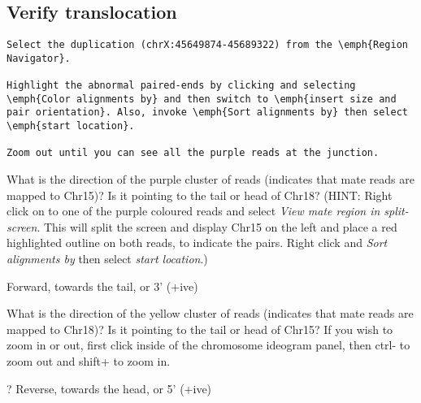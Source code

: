 \subsection{Verify translocation}
\begin{advanced}

\begin{lstlisting}
Select the duplication (chrX:45649874-45689322) from the \emph{Region Navigator}. 

Highlight the abnormal paired-ends by clicking and selecting \emph{Color alignments by} and then switch to \emph{insert size and pair orientation}. Also, invoke \emph{Sort alignments by} then select \emph{start location}.

Zoom out until you can see all the purple reads at the junction.
\end{lstlisting}
\end{advanced}


\begin{questions}
What is the direction of the purple cluster of reads (indicates that mate reads are mapped to Chr15)? Is it pointing to the tail or head of Chr18? 
(HINT: Right click on to one of the purple coloured reads and select \emph{View mate region in split-screen}. This will split the screen and display Chr15 on the left and place a red highlighted outline on both reads, to indicate the pairs. Right click and \emph{Sort alignments by} then select \emph{start location}.)
\begin{answer}
Forward, towards the tail, or 3’ (+ive)
\end{answer}
\end{questions}

\begin{questions}
What is the direction of the yellow cluster of reads (indicates that mate reads are mapped to Chr18)? Is it pointing to the tail or head of Chr15? \newline
If you wish to zoom in or out, first click inside of the chromosome ideogram panel, then ctrl- to zoom out and shift+ to zoom in. 
\begin{answer}
? Reverse, towards the head, or 5’ (+ive)
\end{answer}
\end{questions}

